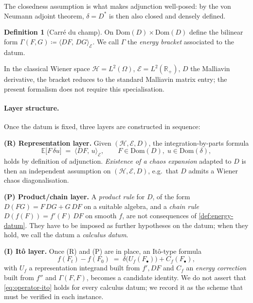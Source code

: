 \documentclass[11pt,reqno]{amsart}
\theoremstyle{plain}
\theoremstyle{definition}
\newtheorem{definition}[theorem]{Definition}
\theoremstyle{remark}
\newcommand{\R}{\mathbb{R}}
\newcommand{\E}{\mathbb{E}}
\newcommand{\Hilb}{\mathcal{H}}
\newcommand{\Dom}{\mathrm{Dom}}
\newcommand{\Energy}{\mathcal{E}}
\newcommand{\Carre}{\Gamma}
\begin{document}
The closedness assumption is what makes adjunction well-posed: by the
von Neumann adjoint theorem, $\delta=D^{*}$ is then also closed and
densely defined.

\begin{definition}[Carr\'e du champ]\label{def:carre}
On $\Dom(D)\times\Dom(D)$ define the bilinear form
$\Carre(F,G)\coloneqq\langle DF,\,DG\rangle_\Energy$.
We call $\Carre$ the \emph{energy bracket} associated to the datum.
\end{definition}

In the classical Wiener space $\Hilb=L^2(\Omega)$,
$\Energy=L^2(\R_+)$, $D$ the Malliavin derivative, the bracket reduces
to the standard Malliavin matrix entry; the present formalism does not
require this specialisation.

\paragraph{Layer structure.}
Once the datum is fixed, three layers are constructed in sequence:

\medskip
\noindent\textbf{(R) Representation layer.}
Given $(\Hilb,\Energy,D)$, the integration-by-parts formula
\begin{equation}\label{eq:ibp}
  \E\bigl[F\,\delta u\bigr]
  \;=\;\langle DF,\,u\rangle_{\Energy},\qquad
  F\in\Dom(D),\;u\in\Dom(\delta),
\end{equation}
holds by definition of adjunction. \emph{Existence of a chaos
expansion} adapted to $D$ is then an independent assumption on
$(\Hilb,\Energy,D)$, e.g.~that $D$ admits a Wiener chaos diagonalisation.

\medskip
\noindent\textbf{(P) Product/chain layer.}
A \emph{product rule} for $D$, of the form
$D(FG)=F\,DG+G\,DF$ on a suitable algebra, and a \emph{chain rule}
$D(f(F))=f'(F)\,DF$ on smooth $f$, are not consequences of
\cref{def:energy-datum}. They have to be imposed as further hypotheses
on the datum; when they hold, we call the datum a \emph{calculus datum}.

\medskip
\noindent\textbf{(I) It\^o layer.}
Once (R) and (P) are in place, an It\^o-type formula
\begin{equation}\label{eq:operator-ito}
  f(F_t)-f(F_0) \;=\; \delta\bigl(U_f(F_\bullet)\bigr) + C_f(F_\bullet),
\end{equation}
with $U_f$ a representation integrand built from $f',DF$ and
$C_f$ an \emph{energy correction} built from $f''$ and $\Carre(F,F)$,
becomes a candidate identity. We do not assert that
\cref{eq:operator-ito} holds for every calculus datum; we record it as
the scheme that must be verified in each instance.
\end{document}
